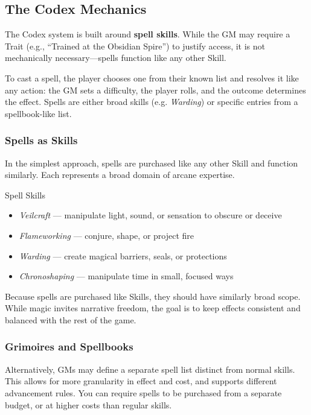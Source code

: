 \subsection{The Codex Mechanics}

The Codex system is built around \textbf{spell skills}. While the GM may require a Trait (e.g., “Trained at the Obsidian Spire”) to justify access, it is not mechanically necessary—spells function like any other Skill.

To cast a spell, the player chooses one from their known list and resolves it like any action: the GM sets a difficulty, the player rolls, and the outcome determines the effect. Spells are either broad skills (e.g. \textit{Warding}) or specific entries from a spellbook-like list.

\subsubsection{Spells as Skills}

In the simplest approach, spells are purchased like any other Skill and function similarly. Each represents a broad domain of arcane expertise.

\begin{Example}{Spell Skills}
    \begin{itemize}
        \item \textit{Veilcraft} — manipulate light, sound, or sensation to obscure or deceive  
        \item \textit{Flameworking} — conjure, shape, or project fire  
        \item \textit{Warding} — create magical barriers, seals, or protections  
        \item \textit{Chronoshaping} — manipulate time in small, focused ways  
    \end{itemize}
\end{Example}

Because spells are purchased like Skills, they should have similarly broad scope. While magic invites narrative freedom, the goal is to keep effects consistent and balanced with the rest of the game.

\subsubsection{Grimoires and Spellbooks}

Alternatively, GMs may define a separate spell list distinct from normal skills. This allows for more granularity in effect and cost, and supports different advancement rules. You can require spells to be purchased from a separate budget, or at higher costs than regular skills.


